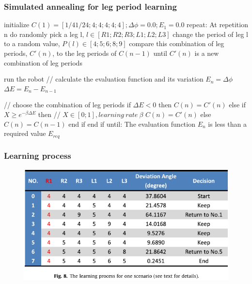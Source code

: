 \documentclass{beamer}
\begin{document}
\begin{frame}[fragile]
\frametitle{Simulated annealing for leg period learning}
\begin{algorithm}[mathescape]
initialize $C(1)= [1/4 1/24; 4; 4; 4; 4; 4]; \Delta\phi= 0.0; E_1 = 0.0$
repeat:
    At repetition n
    do
        randomly pick a leg l, $l \in [R1; R2; R3; L1; L2; L3]$
        change the period of leg l to a random value, $P(l) \in [4; 5; 6; 8; 9]$
        compare this combination of leg periods, $C'(n)$, to the leg periods of $C(n-1)$
    until $C'(n)$ is a new combination of leg periods
    
    run the robot
    // calculate the evaluation function and its variation
    $E_n = \Delta\phi$
    $\Delta E = E_n - E_{n-1}$
    
    // choose the combination of leg periods
    if $\Delta E < 0$ then
        $C(n) = C'(n)$
    else
        if  $X \geq e^{-\beta \Delta E}$ then // $X \in [0;1], learning~rate~\beta$ 
            $C(n) = C'(n)$
        else
            $C(n) = C(n - 1)$
        end if
    end if
until: The evaluation function $E_n$ is less than a required value $E_{req}$
\end{algorithm}
\end{frame}

\begin{frame}
\frametitle{Learning process}
\begin{figure}
\center
\includegraphics[width=1\textwidth]{figs/learning-process.pdf}
\end{figure}
\end{frame}
\end{document}
